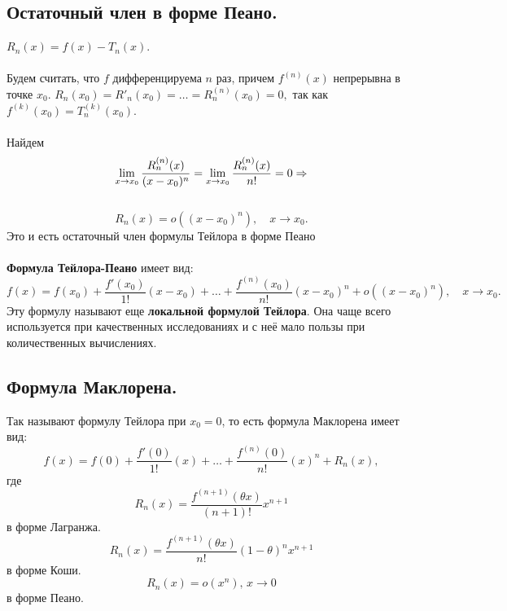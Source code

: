 	\subsection{Остаточный член в форме Пеано.}
	$R_n(x)=f(x)-T_n(x)$.\\\\
	Будем считать, что $f$ дифференцируема $n$ раз, причем $f^{(n)}(x)$ непрерывна в точке $x_0$.
	$R_n(x_0)=R'_n(x_0)=\dots=R^{(n)}_n(x_0)=0,$ так как $f^{(k)}(x_0)=T^{(k)}_n(x_0)$.\\\\
	Найдем $$\lim\limits_{x \to x_0} \frac{R^{(n)}_n(x)}{(x-x_0)^n}= \lim\limits_{x \to x_0} \frac{R^{(n)}_n(x)}{n!}=0\Rightarrow$$\\
	$$R_n(x)=o((x-x_0)^n),\quad x \to x_0.$$
	Это и есть остаточный член формулы Тейлора в форме Пеано\\\\
	\textbf{Формула Тейлора-Пеано} имеет вид:
	$$f(x)=f(x_0)+\frac{f'(x_0)}{1!}(x-x_0)+\ldots+\frac{f^{(n)}(x_0)}{n!}(x-x_0)^n+o((x-x_0)^n),\quad x \to x_0.$$
	Эту формулу называют еще \textbf{локальной формулой Тейлора}. Она чаще всего используется при качественных исследованиях и с неё мало пользы при количественных вычислениях. 
	\subsection{Формула Маклорена.}
	Так называют формулу Тейлора при $x_0=0$, то есть формула Маклорена имеет вид:\\
	$$f(x)=f(0)+\frac{f'(0)}{1!}(x)+\ldots+\frac{f^{(n)}(0)}{n!}(x)^n+R_n(x),$$ где\\
	$$R_n(x)=\frac{f^{(n+1)}(\theta x)}{(n+1)!}x^{n+1}$$ в форме Лагранжа.
	$$R_n(x)=\frac{f^{(n+1)}(\theta x)}{n!}(1-\theta)^n x^{n+1}$$ в форме Коши.
	$$R_n(x)=o(x^n), \, x \to 0$$ в форме Пеано.
